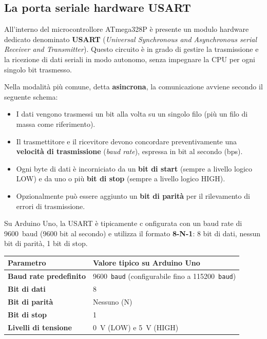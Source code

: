 \subsection*{La porta seriale hardware USART}

All'interno del microcontrollore ATmega328P è presente un modulo hardware dedicato denominato \textbf{USART} (\textit{Universal Synchronous and Asynchronous serial Receiver and Transmitter}). Questo circuito è in grado di gestire la trasmissione e la ricezione di dati seriali in modo autonomo, senza impegnare la CPU per ogni singolo bit trasmesso.

Nella modalità più comune, detta \textbf{asincrona}, la comunicazione avviene secondo il seguente schema:

\begin{itemize}
    \item I dati vengono trasmessi un bit alla volta su un singolo filo (più un filo di massa come riferimento).
    \item Il trasmettitore e il ricevitore devono concordare preventivamente una \textbf{velocità di trasmissione} (\textit{baud rate}), espressa in bit al secondo (bps).
    \item Ogni byte di dati è incorniciato da un \textbf{bit di start} (sempre a livello logico LOW) e da uno o più \textbf{bit di stop} (sempre a livello logico HIGH).
    \item Opzionalmente può essere aggiunto un \textbf{bit di parità} per il rilevamento di errori di trasmissione.
\end{itemize}

Su Arduino Uno, la USART è tipicamente c onfigurata con un baud rate di \SI{9600}{baud} (9600 bit al secondo) e utilizza il formato \textbf{8-N-1}: 8 bit di dati, nessun bit di parità, 1 bit di stop.

\begin{center}
\begin{tabular}{>{\bfseries}l l}
    \toprule
    Parametro & Valore tipico su Arduino Uno \\
    \midrule
    Baud rate predefinito & \SI{9600}{\texttt{baud}} (configurabile fino a \SI{115200}{\texttt{baud}}) \\
    Bit di dati & 8 \\
    Bit di parità & Nessuno (N) \\
    Bit di stop & 1 \\
    Livelli di tensione & \SI{0}{\volt} (LOW) e \SI{5}{\volt} (HIGH) \\
    \bottomrule
\end{tabular}
\end{center}

